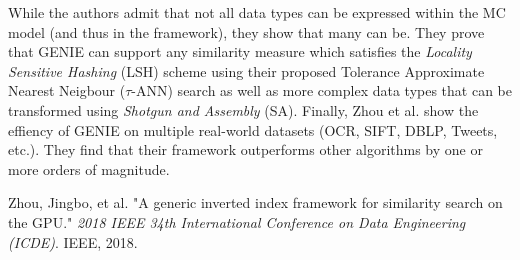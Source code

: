 \documentclass[12pt]{article}
\begin{document}
While the authors admit that not all data types can be expressed within the MC model (and thus in the framework), they show that many can be. They prove that GENIE can support any similarity measure which satisfies the \emph{Locality Sensitive Hashing} (LSH) scheme using their proposed Tolerance Approximate Nearest Neigbour ($\tau$-ANN) search as well as more complex data types that can be transformed using \emph{Shotgun and Assembly} (SA). Finally, Zhou et al. show the effiency of GENIE on multiple real-world datasets (OCR, SIFT, DBLP, Tweets, etc.). They find that their framework outperforms other algorithms by one or more orders of magnitude.

\begin{thebibliography}{9}
Zhou, Jingbo, et al. "A generic inverted index framework for similarity search on the GPU." \emph{2018 IEEE 34th International Conference on Data Engineering (ICDE)}. IEEE, 2018.

\end{thebibliography}
 
\end{document}
